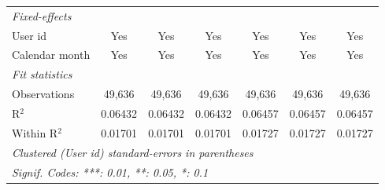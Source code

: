 \begin{table}[htbp]
\begin{footnotesize}
\begin{tabular}{lcccccc}
         \midrule \emph{Fixed-effects} &   &   &   &   &   &  \\
         User id             & Yes            & Yes            & Yes            & Yes            & Yes            & Yes\\
         Calendar month      & Yes            & Yes            & Yes            & Yes            & Yes            & Yes\\
         \midrule \emph{Fit statistics} &   &   &   &   &   &  \\
         Observations        & 49,636         & 49,636         & 49,636         & 49,636         & 49,636         & 49,636\\
         R$^2$               & 0.06432        & 0.06432        & 0.06432        & 0.06457        & 0.06457        & 0.06457\\
         Within R$^2$        & 0.01701        & 0.01701        & 0.01701        & 0.01727        & 0.01727        & 0.01727\\
         \midrule\midrule\multicolumn{7}{l}{\emph{Clustered (User id) standard-errors in parentheses}}\\
         \multicolumn{7}{l}{\emph{Signif. Codes: ***: 0.01, **: 0.05, *: 0.1}}\\
      \end{tabular}
   \end{footnotesize}
\end{table}


